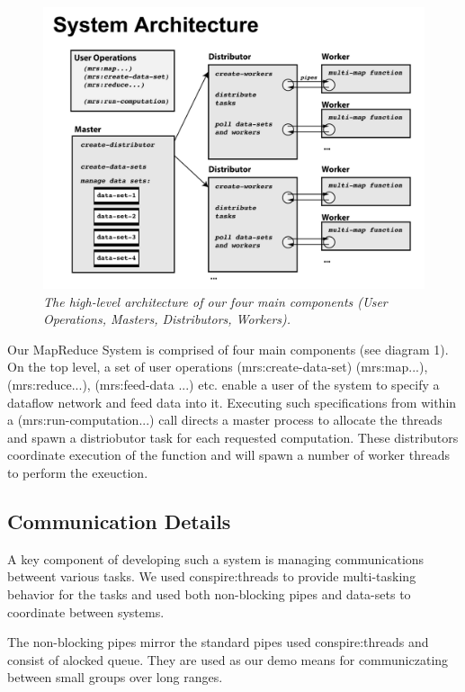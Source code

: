 \documentclass{article}
\begin{document}
\begin{figure}[h!]
\includegraphics[width=\textwidth]{system-arch.png}
  \caption{\emph{\small The high-level architecture of our four main
      components (User Operations, Masters, Distributors, Workers).}}
\label{piefig}
\end{figure}

Our MapReduce System is comprised of four main components (see diagram
1). On the top level, a set of user operations (mrs:create-data-set)
(mrs:map...), (mrs:reduce...), (mrs:feed-data ...) etc. enable a user
of the system to specify a dataflow network and feed data into
it. Executing such specifications from within a
(mrs:run-computation...) call directs a master process to allocate the
threads and spawn a distriobutor task for each requested
computation. These distributors coordinate execution of the function
and will spawn a number of worker threads to perform the exeuction.

\subsection{Communication Details}

A key component of developing such a system is managing communications
betweent various tasks. We used conspire:threads to provide
multi-tasking behavior for the tasks and used both non-blocking pipes
and data-sets to coordinate between systems. 

The non-blocking pipes mirror the standard pipes used conspire:threads
and consist of alocked queue. They are used as our demo means
for communiczating between small groups over long ranges.
\end{document}
